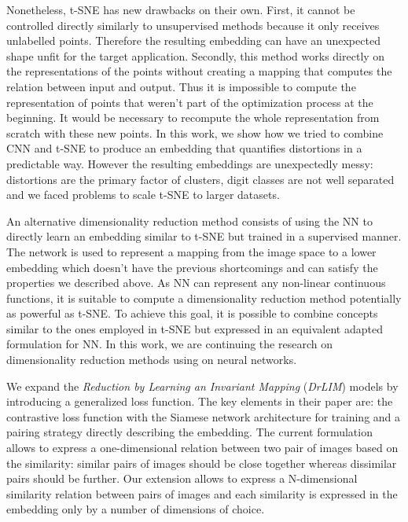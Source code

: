 \documentclass[a4paper,12pt]{report}
\begin{document}
Nonetheless, t-SNE has new drawbacks on their own.
First, it cannot be controlled directly similarly to unsupervised methods because it only receives unlabelled points.
Therefore the resulting embedding can have an unexpected shape unfit for the target application.
Secondly, this method works directly on the representations of the points without creating a mapping that computes the relation between input and output.
Thus it is impossible to compute the representation of points that weren't part of the optimization process at the beginning.
It would be necessary to recompute the whole representation from scratch with these new points.
In this work, we show how we tried to combine CNN and t-SNE to produce an embedding that quantifies distortions in a predictable way.
However the resulting embeddings are unexpectedly messy: distortions are the primary factor of clusters, digit classes are not well separated and we faced problems to scale t-SNE to larger datasets.

An alternative dimensionality reduction method consists of using the NN to directly learn an embedding similar to t-SNE but trained in a supervised manner.
The network is used to represent a mapping from the image space to a lower embedding which doesn't have the previous shortcomings and can satisfy the properties we described above.
As NN can represent any non-linear continuous functions\cite{csaji2001approximation}, it is suitable to compute a dimensionality reduction method potentially as powerful as t-SNE.
To achieve this goal, it is possible to combine concepts similar to the ones employed in t-SNE but expressed in an equivalent adapted formulation for NN.
In this work, we are continuing the research on dimensionality reduction methods using on neural networks.

We expand the {\em Reduction by Learning an Invariant Mapping} ({\em DrLIM}) models\cite{hadsell2006dimensionality} by introducing a generalized loss function.
The key elements in their paper are: the contrastive loss function with the Siamese network architecture for training and a pairing strategy directly describing the embedding.
The current formulation allows to express a one-dimensional relation between two pair of images based on the similarity: similar pairs of images should be close together whereas dissimilar pairs should be further.
Our extension allows to express a N-dimensional similarity relation between pairs of images and each similarity is expressed in the embedding only by a number of dimensions of choice.
\end{document}
